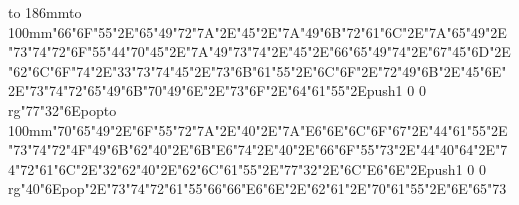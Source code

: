 \hbox to 186mm{\hsize=81mm\vbox to 100mm{\vfill\ipa\char"66\ipa\char"6F\ipa\char"55\ipa\char"2E\ipa\char"65\ipa\char"49\ipa\char"72\ipa\char"7A\ipa\char"2E\ipa\char"45\ipa\char"2E\ipa\char"7A\ipa\char"49\ipa\char"6B\medskip\ipa\char"72\ipa\char"61\ipa\char"6C\ipa\char"2E\ipa\char"7A\ipa\char"65\ipa\char"49\ipa\char"2E\ipa\char"73\ipa\char"74\ipa\char"72\ipa\char"6F\ipa\char"55\ipa\char"44\medskip\ipa\char"70\ipa\char"45\ipa\char"2E\ipa\char"7A\ipa\char"49\ipa\char"73\ipa\char"74\ipa\char"2E\ipa\char"45\ipa\char"2E\ipa\char"66\ipa\char"65\ipa\char"49\ipa\char"74\ipa\char"2E\ipa\char"67\ipa\char"45\ipa\char"6D\ipa\char"2E\ipa\char"62\ipa\char"6C\ipa\char"6F\ipa\char"74\ipa\char"2E\ipa\char"33\ipa\char"73\ipa\char"74\medskip\ipa\char"45\ipa\char"2E\ipa\char"73\ipa\char"6B\ipa\char"61\ipa\char"55\ipa\char"2E\ipa\char"6C\ipa\char"6F\ipa\char"2E\ipa\char"72\ipa\char"49\ipa\char"6B\ipa\char"2E\ipa\char"45\ipa\char"6E\ipa\char"2E\ipa\char"73\ipa\char"74\ipa\char"72\ipa\char"65\ipa\char"49\ipa\char"6B\medskip\ipa\char"70\ipa\char"49\ipa\char"6E\ipa\char"2E\ipa\char"73\ipa\char"6F\ipa\char"2E\ipa\char"64\ipa\char"61\ipa\char"55\ipa\char"2E\pdfcolorstack\match push{1 0 0 rg}\ipa\char"77\ipa\char"32\ipa\char"6E\pdfcolorstack\match pop{}\vfill}\hfill\vbox to 100mm{\vfill\ipa\char"70\ipa\char"65\ipa\char"49\ipa\char"2E\ipa\char"6F\ipa\char"55\ipa\char"72\ipa\char"7A\ipa\char"2E\ipa\char"40\ipa\char"2E\ipa\char"7A\ipa\char"E6\ipa\char"6E\medskip\ipa\char"6C\ipa\char"6F\ipa\char"67\ipa\char"2E\ipa\char"44\ipa\char"61\ipa\char"55\ipa\char"2E\ipa\char"73\ipa\char"74\ipa\char"72\ipa\char"4F\ipa\char"49\ipa\char"6B\medskip\ipa\char"62\ipa\char"40\ipa\char"2E\ipa\char"6B\ipa\char"E6\ipa\char"74\ipa\char"2E\ipa\char"40\ipa\char"2E\ipa\char"66\ipa\char"6F\ipa\char"55\ipa\char"73\ipa\char"2E\ipa\char"44\ipa\char"40\ipa\char"64\ipa\char"2E\ipa\char"74\ipa\char"72\ipa\char"61\ipa\char"6C\ipa\char"2E\ipa\char"32\ipa\char"62\medskip\ipa\char"40\ipa\char"2E\ipa\char"62\ipa\char"6C\ipa\char"61\ipa\char"55\ipa\char"2E\ipa\char"77\ipa\char"32\ipa\char"2E\ipa\char"6C\ipa\char"E6\ipa\char"6E\ipa\char"2E\pdfcolorstack\match push{1 0 0 rg}\ipa\char"40\ipa\char"6E\pdfcolorstack\match pop{}\ipa\char"2E\ipa\char"73\ipa\char"74\ipa\char"72\ipa\char"61\ipa\char"55\ipa\char"66\medskip\ipa\char"66\ipa\char"E6\ipa\char"6E\ipa\char"2E\ipa\char"62\ipa\char"61\ipa\char"2E\ipa\char"70\ipa\char"61\ipa\char"55\ipa\char"2E\ipa\char"6E\ipa\char"65\ipa\char"73\vfill}}\eject
